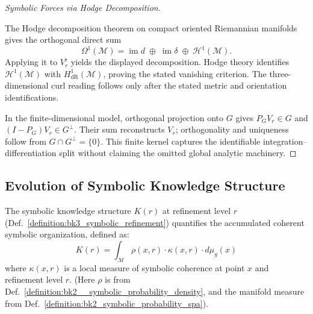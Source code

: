 \begin{proof}[Symbolic Forces via Hodge Decomposition]
\label{proof:bk3_symbolic_helmholtz_decomposition}
\leavevmode

The Hodge decomposition theorem on compact oriented Riemannian manifolds gives
the orthogonal direct sum
\begin{equation}
\Omega^1(\mathcal{M})
 =\operatorname{im}d\;\oplus\;\operatorname{im}\delta
 \;\oplus\;\mathcal{H}^1(\mathcal{M}).
\end{equation}
Applying it to $V_r^\flat$ yields the displayed decomposition.  Hodge theory
identifies $\mathcal{H}^1(\mathcal{M})$ with
$H^1_{\mathrm{dR}}(\mathcal{M})$, proving the stated vanishing criterion.  The
three-dimensional curl reading follows only after the stated metric and
orientation identifications.

In the finite-dimensional model, orthogonal projection onto $G$ gives
$P_GV_r\in G$ and $(I-P_G)V_r\in G^\perp$.  Their sum reconstructs $V_r$;
orthogonality and uniqueness follow from
$G\cap G^\perp=\{0\}$.  This finite kernel captures the identifiable
integration--differentiation split without claiming the omitted global
analytic machinery.
\end{proof}

\subsection{Evolution of Symbolic Knowledge Structure} \label{subsec:bk3_evolution_symbolic_knowledge_structure}

\begin{definition} \label{definition:bk3_symbolic_knowledge_structure}
The symbolic knowledge structure $K(r)$ at refinement level $r$ (Def.~\ref{definition:bk3_symbolic_refinement}) quantifies the accumulated coherent symbolic organization, defined as:
\[
K(r) = \int_{\mathcal{M}} \rho(x,r) \cdot \kappa(x,r) \cdot d\mu_g(x)
\]
where $\kappa(x,r)$ is a local measure of symbolic coherence at point $x$ and refinement level $r$. (Here $\rho$ is from Def.~\ref{definition:bk2__symbolic_probability_density}, and the manifold measure from Def.~\ref{definition:bk2_symbolic_probability_spa}).
\end{definition}

